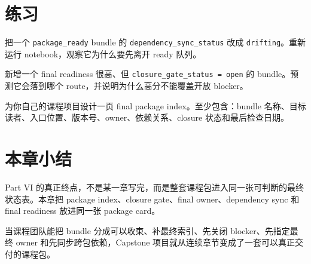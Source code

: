 \section{练习}

\begin{exercisebox}[基础练习]
把一个 \texttt{package\_ready} bundle 的 \texttt{dependency\_sync\_status} 改成 \texttt{drifting}。重新运行 notebook，观察它为什么要先离开 ready 队列。
\end{exercisebox}

\begin{exercisebox}[进阶练习]
新增一个 final readiness 很高、但 \texttt{closure\_gate\_status = open} 的 bundle。预测它会落到哪个 route，并说明为什么高分不能覆盖开放 blocker。
\end{exercisebox}

\begin{exercisebox}[开放练习]
为你自己的课程项目设计一页 final package index。至少包含：bundle 名称、目标读者、入口位置、版本号、owner、依赖关系、closure 状态和最后检查日期。
\end{exercisebox}

\section{本章小结}

Part VI 的真正终点，不是某一章写完，而是整套课程包进入同一张可判断的最终状态表。本章把 package index、closure gate、final owner、dependency sync 和 final readiness 放进同一张 package card。

当课程团队能把 bundle 分成可以收束、补最终索引、先关闭 blocker、先指定最终 owner 和先同步跨包依赖，Capstone 项目就从连续章节变成了一套可以真正交付的课程包。
